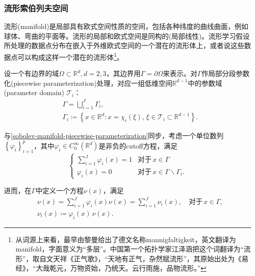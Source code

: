 \subsubsection{流形索伯列夫空间}
\label{sec:sobolev-manifold-space}
\begin{definition}[流形]
  流形(manifold)是局部具有欧式空间性质的空间，包括各种纬度的曲线曲面，例如球体、弯曲的平面等。流形的局部和欧式空间是同构的(局部线性)。流形学习假设所处理的数据点分布在嵌入于外维欧式空间的一个潜在的流形体上，或者说这些数据点可以构成这样一个潜在的流形体\footnote{从词源上来看，最早由黎曼给出了德文名称mannigfaltigkeit，英文翻译为manifold，字面意义为``多层''。中国第一个拓扑学家江泽涵把这个词翻译为``流形''，取自文天祥《正气歌》，``天地有正气，杂然赋流形''，其原始出处为《易经》，``大哉乾元，万物资始，乃统天。云行雨施，品物流形。'' }。
\end{definition}

设一个有边界的域$\Omega \subset \mathbb{R}^d,d=2,3$，其边界用$\Gamma = \partial \Omega$来表示。对$\Gamma$作局部分段参数化(piecewise parameterization)处理，对应一组低维空间$\mathbb{R}^{d-1}$中的参数域(parameter domain) $\mathcal{T}_i$：
\begin{equation}
  \label{sobolev-manifold-piecewise-parameterization}
\begin{split}
    &\Gamma = \bigcup_{i=1}^{J} \Gamma_i,\\
    & \Gamma_i \coloneqq \left\{
    x \in \mathbb{R}^d : x = \chi_{i}(\xi), \, \xi \in \mathcal{T}_i \subset \mathbb{R}^{d-1}
    \right\}.
\end{split}
\end{equation}

与\eqref{sobolev-manifold-piecewise-parameterization}同步，考虑一个单位数列$\left\{ \varphi_i \right\}_{i=1}^{p}$，其中$\varphi_i \in C_0^{\infty}(\mathbb{R}^d)$是非负的cutoff方程，满足
\begin{equation}
  \label{eq:sobolev-manifold-cutoff-func-def}
  \begin{cases}
    \sum_{i=1}^{J} \varphi_{i}(x)=1 & \text{对于} \, x \in \Gamma \\
    \varphi_i(x) = 0  & \text{对于} \, x \in \Gamma \backslash \Gamma_i.
  \end{cases}
\end{equation}

进而，在$\Gamma$中定义一个方程$\nu(x)$，满足
\begin{equation}
  \label{eq:sobolev-manifold-nu-x-def}
  \begin{split}
    &\nu(x) = \sum_{i=1}^{J} \varphi_i(x) \nu(x) = \sum_{i=1}^{J} \nu_i(x), \quad \text{对于} \, x \in \Gamma, \\
    & \nu_i(x) \coloneqq \varphi_i(x) \, \nu(x).
  \end{split}
\end{equation}

